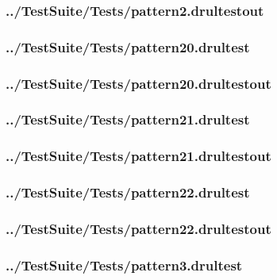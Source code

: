 \begin{changemargin}{-1in}{-1in}
\subsubsection{../TestSuite/Tests/pattern2.drultestout}


\subsubsection{../TestSuite/Tests/pattern20.drultest}


\subsubsection{../TestSuite/Tests/pattern20.drultestout}


\subsubsection{../TestSuite/Tests/pattern21.drultest}


\subsubsection{../TestSuite/Tests/pattern21.drultestout}


\subsubsection{../TestSuite/Tests/pattern22.drultest}


\subsubsection{../TestSuite/Tests/pattern22.drultestout}


\subsubsection{../TestSuite/Tests/pattern3.drultest}



\end{changemargin}
